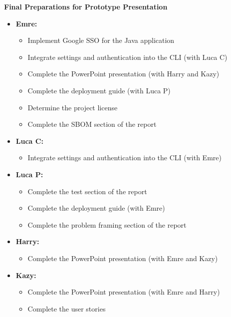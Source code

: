 \documentclass[11pt]{article}
\begin{document}
    \textbf{Final Preparations for Prototype Presentation}
    \begin{itemize}
        \item \textbf{Emre:}
        \begin{itemize}
            \item Implement Google SSO for the Java application
            \item Integrate settings and authentication into the CLI (with Luca C)
            \item Complete the PowerPoint presentation (with Harry and Kazy)
            \item Complete the deployment guide (with Luca P)
            \item Determine the project license
            \item Complete the SBOM section of the report
        \end{itemize}

        \item \textbf{Luca C:}
        \begin{itemize}
            \item Integrate settings and authentication into the CLI (with Emre)
        \end{itemize}

        \item \textbf{Luca P:}
        \begin{itemize}
            \item Complete the test section of the report
            \item Complete the deployment guide (with Emre)
            \item Complete the problem framing section of the report
        \end{itemize}

        \item \textbf{Harry:}
        \begin{itemize}
            \item Complete the PowerPoint presentation (with Emre and Kazy)
        \end{itemize}

        \item \textbf{Kazy:}
        \begin{itemize}
            \item Complete the PowerPoint presentation (with Emre and Harry)
            \item Complete the user stories
        \end{itemize}


\end{itemize}
\end{document}
